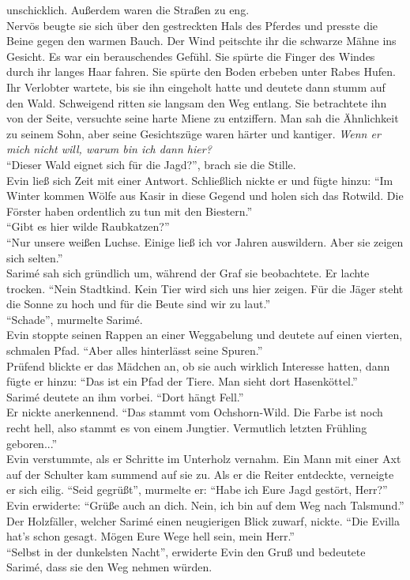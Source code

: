 unschicklich. Außerdem waren die Straßen zu eng.\\
Nervös beugte sie sich über den gestreckten Hals des Pferdes und presste die Beine gegen den warmen 
Bauch. Der Wind peitschte ihr die schwarze Mähne ins Gesicht. Es war ein berauschendes Gefühl. Sie 
spürte die Finger des Windes durch ihr langes Haar fahren. Sie spürte den Boden erbeben unter Rabes 
Hufen.\\
Ihr Verlobter wartete, bis sie ihn eingeholt hatte und deutete dann stumm auf den Wald. 
Schweigend ritten sie langsam den Weg entlang. Sie betrachtete ihn von der Seite, versuchte seine 
harte Miene zu entziffern. Man sah die Ähnlichkeit zu seinem Sohn, aber seine Gesichtszüge 
waren härter und kantiger. \textit{Wenn er mich nicht will, warum bin ich dann hier?}\\
``Dieser Wald eignet sich für die Jagd?'', brach sie die Stille.\\
Evin ließ sich Zeit mit einer Antwort. Schließlich nickte er und fügte hinzu: ``Im Winter kommen 
Wölfe aus Kasir in diese Gegend und holen sich das Rotwild. Die Förster haben ordentlich zu tun mit 
den Biestern.''\\
``Gibt es hier wilde Raubkatzen?''\\
``Nur unsere weißen Luchse. Einige ließ ich vor Jahren auswildern. Aber sie zeigen sich selten.''\\
Sarimé sah sich gründlich um, während der Graf sie beobachtete. Er lachte trocken. ``Nein 
Stadtkind. Kein Tier wird sich uns hier zeigen. Für die Jäger steht die Sonne zu hoch und für die 
Beute sind wir zu laut.''\\
``Schade'', murmelte Sarimé.\\
Evin stoppte seinen Rappen an einer Weggabelung und deutete auf einen vierten, schmalen Pfad. 
``Aber alles hinterlässt seine Spuren.''\\
Prüfend blickte er das Mädchen an, ob sie auch wirklich Interesse hatten, dann fügte er hinzu: 
``Das ist ein Pfad der Tiere. Man sieht dort Hasenköttel.''\\
Sarimé deutete an ihm vorbei. ``Dort hängt Fell.''\\
Er nickte anerkennend. ``Das stammt vom Ochshorn-Wild. Die Farbe ist noch recht hell, also stammt 
es von einem Jungtier. Vermutlich letzten Frühling geboren...''\\
Evin verstummte, als er Schritte im Unterholz vernahm. Ein Mann mit einer Axt auf der Schulter kam 
summend auf sie zu. Als er die Reiter entdeckte, verneigte er sich eilig. ``Seid gegrüßt'', 
murmelte er: ``Habe ich Eure Jagd gestört, Herr?''\\
Evin erwiderte: ``Grüße auch an dich. Nein, ich bin auf dem Weg nach Talsmund.''\\
Der Holzfäller, welcher Sarimé einen neugierigen Blick zuwarf, nickte. ``Die Evilla hat's schon 
gesagt. Mögen Eure Wege hell sein, mein Herr.''\\
``Selbst in der dunkelsten Nacht'', erwiderte Evin den Gruß und bedeutete Sarimé, dass sie den 
Weg nehmen würden.\\

